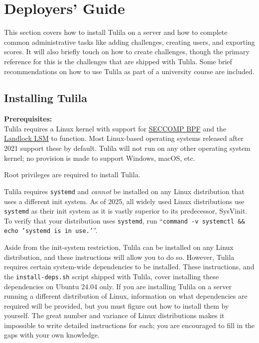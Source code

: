 \documentclass[12pt]{article}
\begin{document}
\section{Deployers' Guide}

This section covers how to install Tulila on a server and how to complete common administrative tasks like adding challenges, creating users, and exporting scores. It will also briefly touch on how to create challenges, though the primary reference for this is the challenges that are shipped with Tulila. Some brief recommendations on how to use Tulila as part of a university course are included.


\subsection{Installing Tulila}

\textbf{Prerequisites:}\\
Tulila requires a Linux kernel with support for \href{https://www.kernel.org/doc/html/v4.17/userspace-api/seccomp_filter.html}{SECCOMP BPF} and the \href{https://docs.kernel.org/security/landlock.html}{Landlock LSM} to function. Most Linux-based operating systems released after 2021 support these by default. Tulila will not run on any other operating system kernel; no provision is made to support Windows, macOS, etc.

Root privileges are required to install Tulila.

Tulila requires \texttt{systemd} and \textit{cannot} be installed on any Linux distribution that uses a different init system. As of 2025, all widely used Linux distributions use \texttt{systemd} as their init system as it is vastly superior to its predecessor, SysVinit. To verify that your distribution uses \texttt{systemd}, run ``\texttt{command -v systemctl \&\& echo 'systemd is in use.'}''.

Aside from the init-system restriction, Tulila can be installed on any Linux distribution, and these instructions will allow you to do so. However, Tulila requires certain system-wide dependencies to be installed. These instructions, and the \texttt{install-deps.sh} script shipped with Tulila, cover installing these dependencies on Ubuntu 24.04 only. If you are installing Tulila on a server running a different distribution of Linux, information on what dependencies are required will be provided, but you must figure out how to install them by yourself. The great number and variance of Linux distributions makes it impossible to write detailed instructions for each; you are encouraged to fill in the gaps with your own knowledge.
\end{document}
